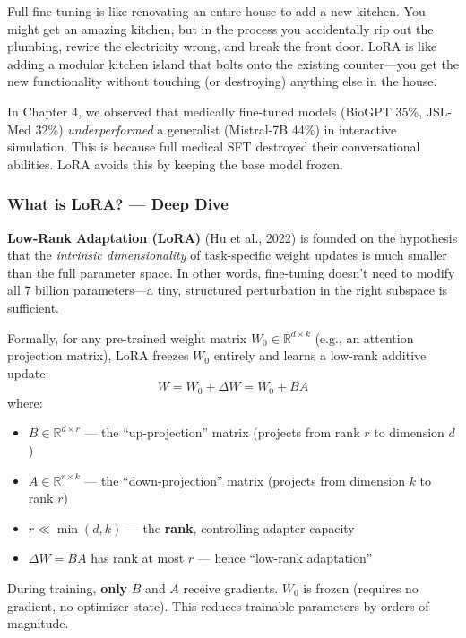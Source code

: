 \begin{analogybox}[\textcolor{white}{Simple Analogy}]
Full fine-tuning is like renovating an entire house to add a new kitchen. You might get an amazing kitchen, but in the process you accidentally rip out the plumbing, rewire the electricity wrong, and break the front door. LoRA is like adding a modular kitchen island that bolts onto the existing counter---you get the new functionality without touching (or destroying) anything else in the house.
\end{analogybox}

\begin{mattersbox}[\textcolor{white}{Why It Matters for This Thesis}]
In Chapter 4, we observed that medically fine-tuned models (BioGPT 35\%, JSL-Med 32\%) \textit{underperformed} a generalist (Mistral-7B 44\%) in interactive simulation. This is because full medical SFT destroyed their conversational abilities. LoRA avoids this by keeping the base model frozen.
\end{mattersbox}

\subsubsection{What is LoRA? --- Deep Dive}

\begin{acadbox}[\textcolor{white}{Academic Definition}]
\textbf{Low-Rank Adaptation (LoRA)} (Hu et al., 2022) is founded on the hypothesis that the \textit{intrinsic dimensionality} of task-specific weight updates is much smaller than the full parameter space. In other words, fine-tuning doesn't need to modify all 7 billion parameters---a tiny, structured perturbation in the right subspace is sufficient.

Formally, for any pre-trained weight matrix $W_0 \in \mathbb{R}^{d \times k}$ (e.g., an attention projection matrix), LoRA freezes $W_0$ entirely and learns a low-rank additive update:
\[
W = W_0 + \Delta W = W_0 + BA
\]
where:
\begin{itemize}
    \item $B \in \mathbb{R}^{d \times r}$ --- the ``up-projection'' matrix (projects from rank $r$ to dimension $d$)
    \item $A \in \mathbb{R}^{r \times k}$ --- the ``down-projection'' matrix (projects from dimension $k$ to rank $r$)
    \item $r \ll \min(d, k)$ --- the \textbf{rank}, controlling adapter capacity
    \item $\Delta W = BA$ has rank at most $r$ --- hence ``low-rank adaptation''
\end{itemize}

During training, \textbf{only} $B$ and $A$ receive gradients. $W_0$ is frozen (requires no gradient, no optimizer state). This reduces trainable parameters by orders of magnitude.
\end{acadbox}

